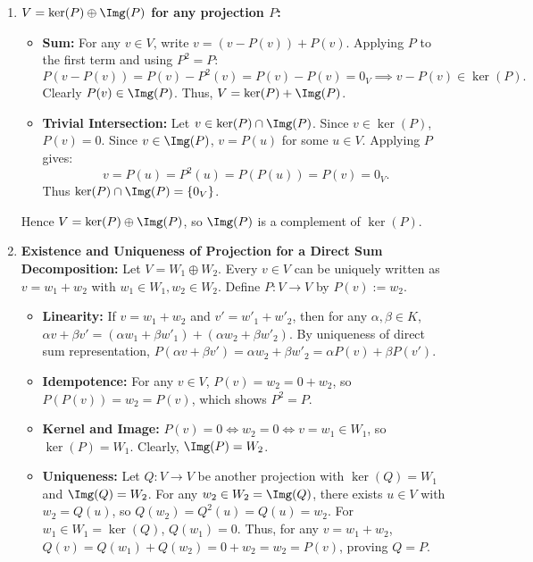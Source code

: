 \begin{exercisesolution}
\label{sol:projections_and_complements}
\begin{enumerate}[label=\textbf{(\alph*)}]
    \item \textbf{$V = \ker(P) \oplus \Img(P)$ for any projection $P$:}
    \begin{itemize}
        \item \textbf{Sum:} For any $v \in V$, write $v = (v - P(v)) + P(v)$.
        Applying $P$ to the first term and using $P^2 = P$:
        \[
        P(v - P(v)) = P(v) - P^2(v) = P(v) - P(v) = 0_V \implies v - P(v) \in \ker(P).
        \]
        Clearly $P(v) \in \Img(P)$. Thus, $V = \ker(P) + \Img(P)$.
        \item \textbf{Trivial Intersection:} Let $v \in \ker(P) \cap \Img(P)$. Since $v \in \ker(P)$, $P(v) = 0$. Since $v \in \Img(P)$, $v = P(u)$ for some $u \in V$. Applying $P$ gives:
        \[
        v = P(u) = P^2(u) = P(P(u)) = P(v) = 0_V.
        \]
        Thus $\ker(P) \cap \Img(P) = \{0_V\}$.
    \end{itemize}
    Hence $V = \ker(P) \oplus \Img(P)$, so $\Img(P)$ is a complement of $\ker(P)$.

    \item \textbf{Existence and Uniqueness of Projection for a Direct Sum Decomposition:}
    Let $V = W_1 \oplus W_2$. Every $v \in V$ can be uniquely written as $v = w_1 + w_2$ with $w_1 \in W_1, w_2 \in W_2$.
    Define $P \colon V \to V$ by $P(v) := w_2$.
    \begin{itemize}
        \item \textbf{Linearity:} If $v = w_1 + w_2$ and $v' = w'_1 + w'_2$, then for any $\alpha, \beta \in K$, $\alpha v + \beta v' = (\alpha w_1 + \beta w'_1) + (\alpha w_2 + \beta w'_2)$. By uniqueness of direct sum representation, $P(\alpha v + \beta v') = \alpha w_2 + \beta w'_2 = \alpha P(v) + \beta P(v')$.
        \item \textbf{Idempotence:} For any $v \in V$, $P(v) = w_2 = 0 + w_2$, so $P(P(v)) = w_2 = P(v)$, which shows $P^2 = P$.
        \item \textbf{Kernel and Image:} $P(v) = 0 \iff w_2 = 0 \iff v = w_1 \in W_1$, so $\ker(P) = W_1$. Clearly, $\Img(P) = W_2$.
        \item \textbf{Uniqueness:} Let $Q \colon V \to V$ be another projection with $\ker(Q) = W_1$ and $\Img(Q) = W_2$. For any $w_2 \in W_2 = \Img(Q)$, there exists $u \in V$ with $w_2 = Q(u)$, so $Q(w_2) = Q^2(u) = Q(u) = w_2$. For $w_1 \in W_1 = \ker(Q)$, $Q(w_1) = 0$. Thus, for any $v = w_1 + w_2$, $Q(v) = Q(w_1) + Q(w_2) = 0 + w_2 = w_2 = P(v)$, proving $Q = P$.
    \end{itemize}
\end{enumerate}
\end{exercisesolution}

